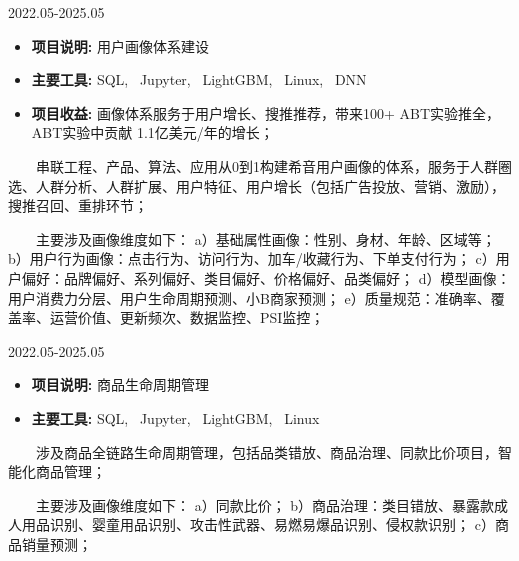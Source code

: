 \documentclass{resume}
\begin{document}
                      {2022.05-2025.05}

\begin{itemize}  [parsep=0.5ex]

  \item   \textbf{  项目说明:  }   {  用户画像体系建设  } 
  \item   \textbf{  主要工具:  }   {  SQL, \ Jupyter, \ LightGBM, \ Linux, \ DNN }
  \item   \textbf{  项目收益:  }   { 画像体系服务于用户增长、搜推推荐，带来100+ ABT实验推全，ABT实验中贡献 1.1亿美元/年的增长； }

\end{itemize}


{   \ \ \ \  串联工程、产品、算法、应用从0到1构建希音用户画像的体系，服务于人群圈选、人群分析、人群扩展、用户特征、用户增长（包括广告投放、营销、激励），搜推召回、重排环节；

\ \ \ \ 主要涉及画像维度如下：
a）基础属性画像：性别、身材、年龄、区域等；
b）用户行为画像：点击行为、访问行为、加车/收藏行为、下单支付行为；
c）用户偏好：品牌偏好、系列偏好、类目偏好、价格偏好、品类偏好；
d）模型画像：用户消费力分层、用户生命周期预测、小B商家预测；
e）质量规范：准确率、覆盖率、运营价值、更新频次、数据监控、PSI监控；
}

\medskip











                      {2022.05-2025.05}

\begin{itemize}  [parsep=0.5ex]

  \item   \textbf{  项目说明:  }   {  商品生命周期管理  } 
  \item   \textbf{  主要工具:  }   {  SQL, \ Jupyter, \ LightGBM, \ Linux }

\end{itemize}


{   \ \ \ \  涉及商品全链路生命周期管理，包括品类错放、商品治理、同款比价项目，智能化商品管理；

\ \ \ \ 主要涉及画像维度如下：
a）同款比价；
b）商品治理：类目错放、暴露款成人用品识别、婴童用品识别、攻击性武器、易燃易爆品识别、侵权款识别；
c）商品销量预测；
}
\end{document}

